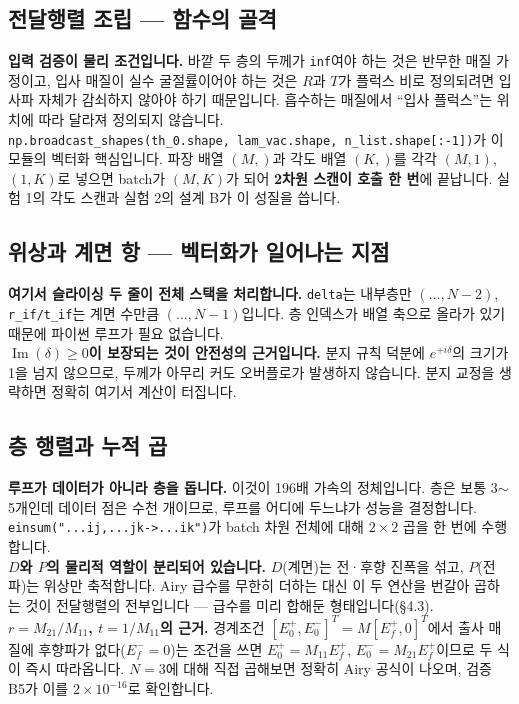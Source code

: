 \documentclass[10pt,a4paper]{article}
\newcommand{\note}[1]{%
  \begin{tcolorbox}[enhanced,breakable,colback=white,colframe=accent,
    boxrule=0pt,leftrule=1.6pt,arc=0pt,outer arc=0pt,
    left=6pt,right=2pt,top=3pt,bottom=3pt,boxsep=0pt,
    before skip=5pt, after skip=8pt]
  #1
  \end{tcolorbox}}
\newcommand{\Imag}{\operatorname{Im}}
\begin{document}
\subsection{전달행렬 조립 — 함수의 골격}

\note{
\textbf{입력 검증이 물리 조건입니다.} 바깥 두 층의 두께가 \texttt{inf}여야 하는 것은
반무한 매질 가정이고, 입사 매질이 실수 굴절률이어야 하는 것은 $R$과 $T$가
플럭스 비로 정의되려면 입사파 자체가 감쇠하지 않아야 하기 때문입니다.
흡수하는 매질에서 ``입사 플럭스''는 위치에 따라 달라져 정의되지 않습니다.\\[4pt]
\texttt{np.broadcast\_shapes(th\_0.shape, lam\_vac.shape, n\_list.shape[:-1])}가 이 모듈의
벡터화 핵심입니다. 파장 배열 $(M,)$과 각도 배열 $(K,)$를 각각
$(M,1)$, $(1,K)$로 넣으면 batch가 $(M,K)$가 되어 \textbf{2차원 스캔이 호출 한 번}에 끝납니다.
실험 1의 각도 스캔과 실험 2의 설계 B가 이 성질을 씁니다.
}
\subsection{위상과 계면 항 — 벡터화가 일어나는 지점}

\note{
\textbf{여기서 슬라이싱 두 줄이 전체 스택을 처리합니다.}
\texttt{delta}는 내부층만 $(\ldots,N-2)$, \texttt{r\_if/t\_if}는 계면 수만큼 $(\ldots,N-1)$입니다.
층 인덱스가 배열 축으로 올라가 있기 때문에 파이썬 루프가 필요 없습니다.\\[4pt]
\textbf{$\Imag(\delta)\ge0$이 보장되는 것이 안전성의 근거입니다.} 분지 규칙 덕분에
$e^{+i\delta}$의 크기가 1을 넘지 않으므로, 두께가 아무리 커도 오버플로가 발생하지 않습니다.
분지 교정을 생략하면 정확히 여기서 계산이 터집니다.
}
\subsection{층 행렬과 누적 곱}

\note{
\textbf{루프가 데이터가 아니라 층을 돕니다.} 이것이 196배 가속의 정체입니다.
층은 보통 3$\sim$5개인데 데이터 점은 수천 개이므로, 루프를 어디에 두느냐가 성능을 결정합니다.
\texttt{einsum("...ij,...jk->...ik")}가 batch 차원 전체에 대해 $2\times2$ 곱을 한 번에 수행합니다.\\[4pt]
\textbf{$D$와 $P$의 물리적 역할이 분리되어 있습니다.} $D$(계면)는 전·후향 진폭을 섞고,
$P$(전파)는 위상만 축적합니다. Airy 급수를 무한히 더하는 대신 이 두 연산을 번갈아
곱하는 것이 전달행렬의 전부입니다 — 급수를 미리 합해둔 형태입니다(§4.3).\\[4pt]
\textbf{$r=M_{21}/M_{11}$, $t=1/M_{11}$의 근거.} 경계조건
$[E_0^+,E_0^-]^T = M[E_f^+,0]^T$에서 출사 매질에 후향파가 없다($E_f^-=0$)는 조건을 쓰면
$E_0^+=M_{11}E_f^+$, $E_0^-=M_{21}E_f^+$이므로 두 식이 즉시 따라옵니다.
$N=3$에 대해 직접 곱해보면 정확히 Airy 공식이 나오며, 검증 B5가 이를 $2\times10^{-16}$로 확인합니다.
}
\end{document}

